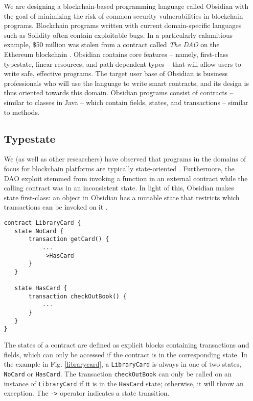 \documentclass[sigplan,10pt,review]{acmart}\settopmatter{printfolios=true}
\begin{document}
We are designing a blockchain-based programming language called Obsidian \cite{Coblenz} with the goal of 
minimizing the risk of common security vulnerabilities in blockchain programs. Blockchain
programs written with current domain-specific languages such as Solidity \cite{Solidity} often contain
exploitable bugs. In a particularly calamitious example, \$50 million was stolen from a contract called \textit{The DAO} on the 
Ethereum blockchain \cite{Sirer}. Obsidian contains core features
 -- namely, first-class typestate, linear resources, and path-dependent types -- that will allow users 
to write safe, effective programs. The target 
user base of Obsidian is business professionals who will use the language to write smart contracts, 
and its design is thus oriented towards this domain. Obsidian programs consist of contracts --
similar to classes in Java -- which contain fields, states, and transactions -- similar to methods.

\subsection{Typestate}

We (as well as other researchers) have observed that programs in the domains of focus for blockchain platforms are typically state-oriented \cite{State}. Furthermore, the DAO exploit stemmed from invoking a function in an external contract while the calling contract was in an inconsistent state.
In light of this, Obsidian makes state first-class: an object in Obsidian has a mutable state that restricts which 
transactions can be invoked on it \cite{Aldrich}. 

\begin{lstlisting}[caption={An example of states in Obsidian.}, captionpos = b, label = librarycard]
contract LibraryCard {
   state NoCard {
       transaction getCard() {
           ...
           ->HasCard
       }
   }
  
   state HasCard {
       transaction checkOutBook() {
           ...
       }
   }
}
\end{lstlisting}

The states of a contract are defined as explicit blocks containing 
transactions and fields, which can only be accessed if the contract is in the corresponding state. 
In the example in Fig. \ref{librarycard}, a \texttt{\small{LibraryCard}} is always in one of two
states, \texttt{\small{NoCard}} or \texttt{\small{HasCard}}. The transaction 
\texttt{\small{checkOutBook}} can only be called on an instance of 
\texttt{\small{LibraryCard}} if it is in the \texttt{\small{HasCard}} state; otherwise, it will throw an exception. 
The \texttt{\small{->}} operator indicates a state transition.
\end{document}
